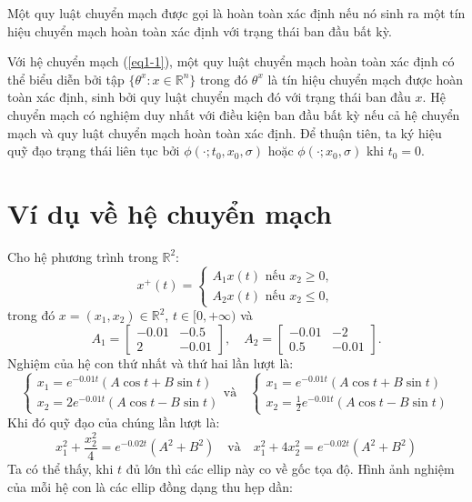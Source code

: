 \documentclass[14pt,a4paper,oneside]{report}		%
\theoremstyle{definition}
\begin{document}
Một quy luật chuyển mạch được gọi là hoàn toàn xác định nếu nó sinh ra một tín hiệu chuyển mạch hoàn toàn xác định với trạng thái ban đầu bất kỳ.

Với hệ chuyển mạch (\ref{eq1-1}), một quy luật chuyển mạch hoàn toàn xác định có thể biểu diễn bởi tập $\{\theta^x:x\in\mathbb{R}^n\}$ trong đó $\theta^x$ là tín hiệu chuyển mạch được hoàn toàn xác định, sinh bởi quy luật chuyển mạch đó với trạng thái ban đầu $x$. Hệ chuyển mạch có nghiệm duy nhất với điều kiện ban đầu bất kỳ nếu cả hệ chuyển mạch và quy luật chuyển mạch hoàn toàn xác định. Để thuận tiên, ta ký hiệu quỹ đạo trạng thái liên tục bởi $\phi(\cdot;t_0,x_0,\sigma)$ hoặc $\phi(\cdot;x_0,\sigma)$ khi $t_0=0$.

\section{Ví dụ về hệ chuyển mạch}
Cho hệ phương trình trong $\mathbb{R}^2$:
$$x^+(t) = 
\begin{cases} 
A_1x(t) \mbox{ nếu } x_2\geq 0, \\ 
A_2x(t) \mbox{ nếu } x_2\leq 0,
\end{cases}
$$
trong đó $x=(x_1,x_2)\in\mathbb{R}^2$, $t\in[0,+\infty)$ và
$$
A_1 = \begin{bmatrix} -0.01 & -0.5 \\ 2 & -0.01 \end{bmatrix} ,\quad 
A_2 = \begin{bmatrix} -0.01 & -2 \\ 0.5 & -0.01 \end{bmatrix} .
$$
Nghiệm của hệ con thứ nhất và thứ hai lần lượt là:
$$
\begin{cases}
x_1 = e^{-0.01t}(A\cos t+B\sin t)\\
x_2 = 2e^{-0.01t}(A\cos t-B\sin t)
\end{cases}
\text{và}\quad
\begin{cases}
x_1 = e^{-0.01t}(A\cos t+B\sin t)\\
x_2 = \frac{1}{2} e^{-0.01t}(A\cos t-B\sin t)
\end{cases}
$$
Khi đó quỹ đạo của chúng lần lượt là:
$$
x^2_1 + \frac{x_2^2}{4} = e^{-0.02t}(A^2+B^2) \quad\text{và}\quad x^2_1 + 4x_2^2 = e^{-0.02t}(A^2+B^2)
$$
Ta có thể thấy, khi $t$ đủ lớn thì các ellip này co về gốc tọa độ. Hình ảnh nghiệm của mỗi hệ con là các ellip đồng dạng thu hẹp dần:
\end{document}
